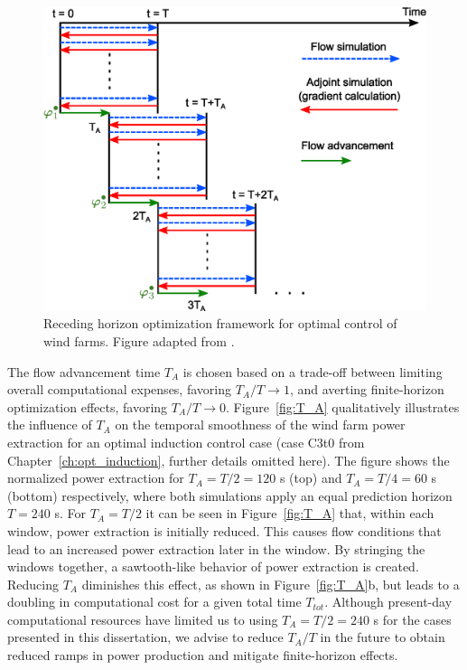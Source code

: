 \begin{figure}[]
	\centering
	\includegraphics[width=0.65\linewidth]{chapters/optimal_control_problem/figure2.eps}
	\caption[Receding horizon optimization framework for optimal control of wind farms.]{Receding horizon optimization framework for optimal control of wind farms. Figure adapted from \cite{goit2015optimal}.}
	\label{fig:drawing_receding_horizon}
\end{figure}

The flow advancement time $T_A$ is chosen based on a trade-off between limiting overall computational expenses, favoring $T_A/T \rightarrow 1$, and averting finite-horizon optimization effects, favoring $T_A/T \rightarrow 0$. Figure~\ref{fig:T_A} qualitatively illustrates the influence of $T_A$ on the temporal smoothness of the wind farm power extraction for an optimal induction control case (case C3t0 from Chapter~\ref{ch:opt_induction}, further details omitted here). The figure shows the normalized power extraction for $T_A = T/2 = 120$ s (top) and $T_A = T/4 = 60$ s (bottom) respectively, where both simulations apply an equal prediction horizon $T = 240$ s. For $T_A = T/2$ it can be seen in Figure~\ref{fig:T_A} that, within each window, power extraction is initially reduced. This causes flow conditions that lead to an increased power extraction later in the window. By stringing the windows together, a sawtooth-like behavior of power extraction is created. Reducing $T_A$ diminishes this effect, as shown in Figure~\ref{fig:T_A}b, but leads to a doubling in computational cost for a given total time $T_{tot}$. Although present-day computational resources have limited us to using $T_A = T/2 = 240$ s for the cases presented in this dissertation, we advise to reduce $T_A/T$ in the future to obtain reduced ramps in power production and mitigate finite-horizon effects.


